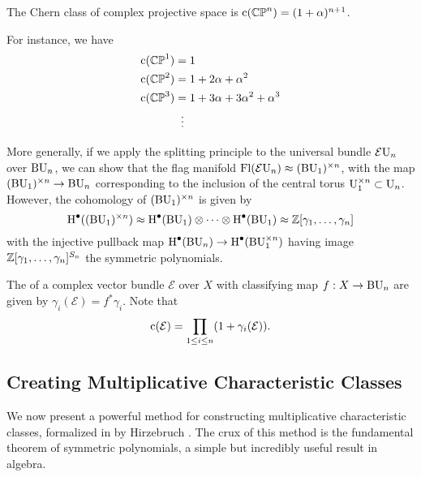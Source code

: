 \begin{corollary}
	The Chern class of complex projective space is $\mathrm{c}(\mathbb{CP}^n)=(1+\alpha)^{n+1}$.
\end{corollary}
\begin{example}
	For instance, we have
	\[
		\begin{aligned}
			\mathrm{c}(\mathbb{CP}^1) &= 1\\
			\mathrm{c}(\mathbb{CP}^2) &= 1+2\alpha+\alpha^2\\
			\mathrm{c}(\mathbb{CP}^3) &= 1+3\alpha + 3\alpha^2+\alpha^3\\
								 &\;\;\vdots
		\end{aligned}
	\]
\end{example}

More generally, if we apply the splitting principle to the universal bundle $\mathcal{E}\mathrm{U}_n$ over $\mathrm{BU}_n$, we can show that the flag manifold $\operatorname{Fl}(\mathcal{E}\mathrm{U}_n)\approx (\mathrm{BU}_1)^{\times n}$, with the map $(\mathrm{BU}_1)^{\times n} \to \mathrm{BU}_n$ corresponding to the inclusion of the central torus $\mathrm{U}_1^{\times n}\subset \mathrm{U}_n$. However, the cohomology of $(\mathrm{BU}_1)^{\times n}$ is given by
\[
	\operatorname{H}^\bullet((\mathrm{BU}_1)^{\times n}) \approx \operatorname{H}^\bullet(\mathrm{BU}_1)\otimes\cdots\otimes \operatorname{H}^\bullet(\mathrm{BU}_1) \approx \mathbb{Z}[\gamma_1,\ldots,\gamma_n]
\]
with the injective pullback map $\operatorname{H}^\bullet(\mathrm{BU}_n) \to \operatorname{H}^\bullet(\mathrm{BU}_1^{\times n})$ having image $\mathbb{Z}[\gamma_1,\ldots, \gamma_n]^{S_n}$ the symmetric polynomials.


\begin{definition}\label{def:chern-roots}
	The  of a complex vector bundle $\mathcal{E}$ over $X$ with classifying map $f : X \to \mathrm{BU}_n$ are given by $\gamma_i(\mathcal{E}) = f^*\gamma_i$. Note that
	\[ \mathrm{c}(\mathcal{E}) = \prod_{1\leq i \leq n} (1+\gamma_i(\mathcal{E})). \]
\end{definition}

\subsection{Creating Multiplicative Characteristic Classes}

We now present a powerful method for constructing multiplicative characteristic classes, formalized in by Hirzebruch \cite{hirzebruch1966methods}. The crux of this method is the fundamental theorem of symmetric polynomials, a simple but incredibly useful result in algebra.


